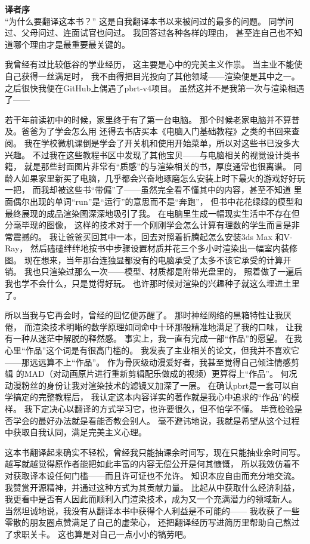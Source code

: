 {\Huge\bfseries 译者序}\vspace{30pt}\\

“为什么要翻译这本书？”
这是自我翻译本书以来被问过的最多的问题。
同学问过、父母问过、连面试官也问过。
我回答过各种各样的理由，
甚至连自己也不知道哪个理由才是最重要最关键的。

我曾经有过比较低谷的学业经历，
这主要是心中的完美主义作祟。
当主业不能使自己获得一丝满足时，
我不由得把目光投向了其他领域——渲染便是其中之一。
之后很快我便在GitHub上偶遇了pbrt-v4项目。
虽然这并不是我第一次与渲染相遇了——

若干年前读初中的时候，家里终于有了第一台电脑。
那个时候老家电脑并不算普及。爸爸为了学会怎么用
还得去书店买本《电脑入门基础教程》之类的书回来查阅。
我在学校微机课倒是学会了开关机和使用开始菜单，所以对这些书已没多大兴趣。
不过我在这些教程书区中发现了其他宝贝——与电脑相关的视觉设计类书籍，
就是那些封面图片非常有“质感”的与渲染相关的书，厚度通常也很离谱。
同龄人如果家里新买了电脑，几乎都会兴奋地琢磨怎么安装上时下最火的游戏好好玩一把，
而我却被这些书“带偏”了——虽然完全看不懂其中的内容，甚至不知道
里面偶尔出现的单词“run”是“运行”的意思而不是“奔跑”，
但书中花花绿绿的模型和最终展现的成品渲染图深深地吸引了我。
在电脑里生成一幅现实生活中不存在但分毫毕现的图像，
这样的技术对于一个刚刚学会怎么计算有理数的学生而言是非常震撼的。
我让爸爸买回其中一本，回去对照着折腾起怎么安装3ds Max\textsuperscript{\textregistered}
和V-Ray\textsuperscript{\textregistered}，
然后磕磕绊绊地按书中步骤设置材质并花三个多小时渲染出一幅室内装修图。
现在想来，当年那台连独显都没有的电脑承受了太多不该它承受的计算开销。
我也只渲染过那么一次——模型、材质都是附带光盘里的，
照着做了一遍后我也学不会什么，只是觉得好玩。
也许那时候对渲染的兴趣种子就这么埋进土里了。

所以当我与它再会时，曾经的回忆便苏醒了。
那时神经网络的黑箱特性让我厌倦，
而渲染技术明晰的数学原理如同命中十环那般精准地满足了我的口味，
让我有一种从迷茫中解脱的释然感。
事实上，我一直有完成一部“作品”的愿望。
在我心里“作品”这个词是有很高门槛的。
我发表了主业相关的论文，但我并不喜欢它——那远远算不上“作品”。
作为骨灰级动漫爱好者，我甚至觉得自己倾注情感剪辑
的MAD（对动画原片进行重新剪辑配乐做成的视频）更算得上“作品”。
何况动漫粉丝的身份让我对渲染技术的滤镜又加深了一层。
在确认pbrt是一套可以自学搞定的完整教程后，
我认定这本内容详实的著作就是我心中追求的“作品”的模样。
我下定决心以翻译的方式学习它，也许要很久，但不怕学不懂。
毕竟检验是否学会的最好办法就是看能否教会别人。
毫不避讳地说，我就是希望从这个过程中获取自我认同，满足完美主义心理。

这本书翻译起来确实不轻松，曾经我只能抽课余时间写，现在只能抽业余时间写。
越写就越觉得原作者能把如此丰富的内容无偿公开是何其慷慨，
所以我效仿着不对获取译本设任何门槛——而且许可证也不允许。
知识本应自由而充分地交流。我赞赏开源精神，并通过这种方式为其贡献力量。
比起从中获取什么经济利益，我更看中是否有人因此而顺利入门渲染技术，成为又一个充满潜力的领域新人。
当然坦诚地说，我没有从翻译本书中获得个人利益是不可能的——
我收获了一些零散的朋友圈点赞满足了自己的虚荣心，
还把翻译经历写进简历里帮助自己熬过了求职关卡。
这也算是对自己一点小小的犒劳吧。

